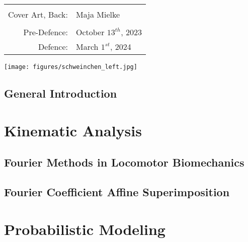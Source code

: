 \documentclass[12pt,a4paper,twoside]{report}
\newcommand\cleartoleftpage{
\ifodd\value{page}\hbox{}\clearpage\else\hbox{}\fi
}
\newcommand\cleartorightpage{
\ifodd\value{page}\hbox{}\clearpage\else\hbox{}\cleardoublepage\fi
\hbox{}
}
\begin{document}
\begin{spacing}{2}
\begin{footnotesize}
{\begin{tabular}{ r   l }
               \\
               \\ Cover Art, Back: & Maja Mielke
               \\
               \\ Pre-Defence: & October \(13^{th}\), 2023
               \\ Defence: & March \(1^{st}\), 2024
            \end{tabular}}
            \begin{flushright}
                \vspace{-1cm}\texttt{[image: figures/schweinchen\_left.jpg]}
            \end{flushright}
            \end{footnotesize}
        \end{spacing}
\makeatother
\thispagestyle{empty}

\onehalfspacing
\cleartorightpage
\setcounter{tocdepth}{1}
\begin{spacing}{1.0}
\tableofcontents
\end{spacing}

\chapter{General Introduction}\label{cpt:generalintro}
\clearpage




\cleartorightpage
\part{Kinematic Analysis}\label{pt:1}
\cleartoleftpage
\chapter{Fourier Methods in Locomotor Biomechanics}\label{cpt:fourier_review}


\cleartoleftpage
\chapter{Fourier Coefficient Affine Superimposition}\label{cpt:fcas}




\cleartorightpage
\part{Probabilistic Modeling}\label{pt:2}
\end{document}
